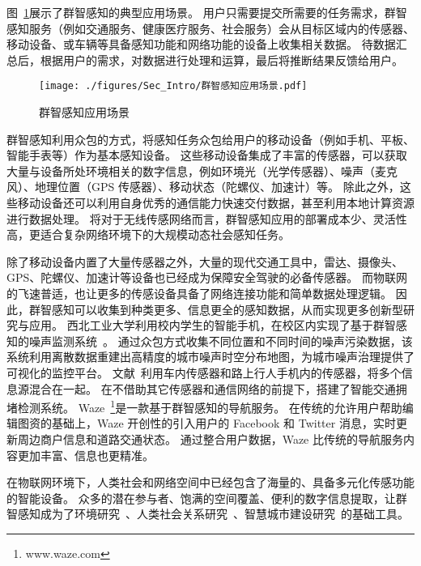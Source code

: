 图~\ref{Figure_MCS_Application}展示了群智感知的典型应用场景。
用户只需要提交所需要的任务需求，群智感知服务（例如交通服务、健康医疗服务、社会服务）会从目标区域内的传感器、移动设备、或车辆等具备感知功能和网络功能的设备上收集相关数据。
待数据汇总后，根据用户的需求，对数据进行处理和运算，最后将推断结果反馈给用户。

\begin{figure}[!h]
  \centering
  \texttt{[image: ./figures/Sec\_Intro/群智感知应用场景.pdf]}
  \vspace{-0.5em}
  \caption{群智感知应用场景}
  \label{Figure_MCS_Application}
\end{figure}

群智感知利用众包的方式，将感知任务众包给用户的移动设备（例如手机、平板、智能手表等）作为基本感知设备。
这些移动设备集成了丰富的传感器，可以获取大量与设备所处环境相关的数字信息，例如环境光（光学传感器）、噪声（麦克风）、地理位置（GPS 传感器）、移动状态（陀螺仪、加速计）等。
除此之外，这些移动设备还可以利用自身优秀的通信能力快速交付数据，甚至利用本地计算资源进行数据处理。
将对于无线传感网络而言，群智感知应用的部署成本少、灵活性高，更适合复杂网络环境下的大规模动态社会感知任务。

除了移动设备内置了大量传感器之外，大量的现代交通工具中，雷达、摄像头、GPS、陀螺仪、加速计等设备也已经成为保障安全驾驶的必备传感器。
而物联网的飞速普适，也让更多的传感设备具备了网络连接功能和简单数据处理逻辑。
因此，群智感知可以收集到种类更多、信息更全的感知数据，从而实现更多创新型研究与应用。
西北工业大学利用校内学生的智能手机，在校区内实现了基于群智感知的噪声监测系统~\cite{CNKI/2014/CSNSYu}。
通过众包方式收集不同位置和不同时间的噪声污染数据，该系统利用离散数据重建出高精度的城市噪声时空分布地图，为城市噪声治理提供了可视化的监控平台。
文献~\cite{DBLP:conf/wcnc/AliAEJH12}利用车内传感器和路上行人手机内的传感器，将多个信息源混合在一起。
在不借助其它传感器和通信网络的前提下，搭建了智能交通拥堵检测系统。
Waze~\footnote{www.waze.com}是一款基于群智感知的导航服务。
在传统的允许用户帮助编辑图资的基础上，Waze 开创性的引入用户的 Facebook 和 Twitter 消息，实时更新周边商户信息和道路交通状态。
通过整合用户数据，Waze 比传统的导航服务内容更加丰富、信息也更精准。

在物联网环境下，人类社会和网络空间中已经包含了海量的、具备多元化传感功能的智能设备。
众多的潜在参与者、饱满的空间覆盖、便利的数字信息提取，让群智感知成为了环境研究~\cite{DBLP:conf/sensys/DuttaAKMMWW09}、人类社会关系研究~\cite{DBLP:conf/globecom/AslIAM13}、智慧城市建设研究~\cite{DBLP:journals/cm/WangZWCHM16}的基础工具。

